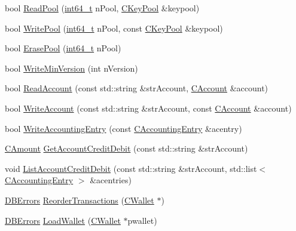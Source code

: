 \begin{DoxyCompactItemize}
\item 
bool \hyperlink{class_c_wallet_d_b_a6a03927cf247314ccd9b285139de0bd1}{Read\+Pool} (\hyperlink{stdint_8h_adec1df1b8b51cb32b77e5b86fff46471}{int64\+\_\+t} n\+Pool, \hyperlink{class_c_key_pool}{C\+Key\+Pool} \&keypool)
\item 
bool \hyperlink{class_c_wallet_d_b_ad43630ad28a68c3e8b1a633f09aa0964}{Write\+Pool} (\hyperlink{stdint_8h_adec1df1b8b51cb32b77e5b86fff46471}{int64\+\_\+t} n\+Pool, const \hyperlink{class_c_key_pool}{C\+Key\+Pool} \&keypool)
\item 
bool \hyperlink{class_c_wallet_d_b_ac78d839fbda5164c4134ab67911139ca}{Erase\+Pool} (\hyperlink{stdint_8h_adec1df1b8b51cb32b77e5b86fff46471}{int64\+\_\+t} n\+Pool)
\item 
bool \hyperlink{class_c_wallet_d_b_ab008b6c6e09a60a988cac6e1a9e11886}{Write\+Min\+Version} (int n\+Version)
\item 
bool \hyperlink{class_c_wallet_d_b_afa8d9d374072629b360adb49b9bdd584}{Read\+Account} (const std\+::string \&str\+Account, \hyperlink{class_c_account}{C\+Account} \&account)
\item 
bool \hyperlink{class_c_wallet_d_b_afef640a4990f74fd5af7178c99415cf3}{Write\+Account} (const std\+::string \&str\+Account, const \hyperlink{class_c_account}{C\+Account} \&account)
\item 
bool \hyperlink{class_c_wallet_d_b_a958a0138b171e213be35f48933adcb89}{Write\+Accounting\+Entry} (const \hyperlink{class_c_accounting_entry}{C\+Accounting\+Entry} \&acentry)
\item 
\hyperlink{amount_8h_a4eaf3a5239714d8c45b851527f7cb564}{C\+Amount} \hyperlink{class_c_wallet_d_b_af924f6275a873e048699e6ef0bf66346}{Get\+Account\+Credit\+Debit} (const std\+::string \&str\+Account)
\item 
void \hyperlink{class_c_wallet_d_b_a51555c82291fe16081880110541e207f}{List\+Account\+Credit\+Debit} (const std\+::string \&str\+Account, std\+::list$<$ \hyperlink{class_c_accounting_entry}{C\+Accounting\+Entry} $>$ \&acentries)
\item 
\hyperlink{walletdb_8h_a7558d92e9ea1d446075da1b514c4a944}{D\+B\+Errors} \hyperlink{class_c_wallet_d_b_afc27d9c9eef8b31851e6b02dc3191425}{Reorder\+Transactions} (\hyperlink{class_c_wallet}{C\+Wallet} $\ast$)
\item 
\hyperlink{walletdb_8h_a7558d92e9ea1d446075da1b514c4a944}{D\+B\+Errors} \hyperlink{class_c_wallet_d_b_a14f26e53502d1a60dd2b034f830acf03}{Load\+Wallet} (\hyperlink{class_c_wallet}{C\+Wallet} $\ast$pwallet)
\end{DoxyCompactItemize}
